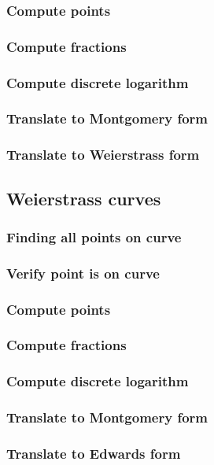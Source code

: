 \documentclass{article}
\begin{document}
\subsubsection{Compute points}
\subsubsection{Compute fractions}
\subsubsection{Compute discrete logarithm}
\subsubsection{Translate to Montgomery form}
\subsubsection{Translate to Weierstrass form}

\subsection{Weierstrass curves}
\subsubsection{Finding all points on curve}
\subsubsection{Verify point is on curve}
\subsubsection{Compute points}
\subsubsection{Compute fractions}
\subsubsection{Compute discrete logarithm}
\subsubsection{Translate to Montgomery form}
\subsubsection{Translate to Edwards form}
\end{document}
